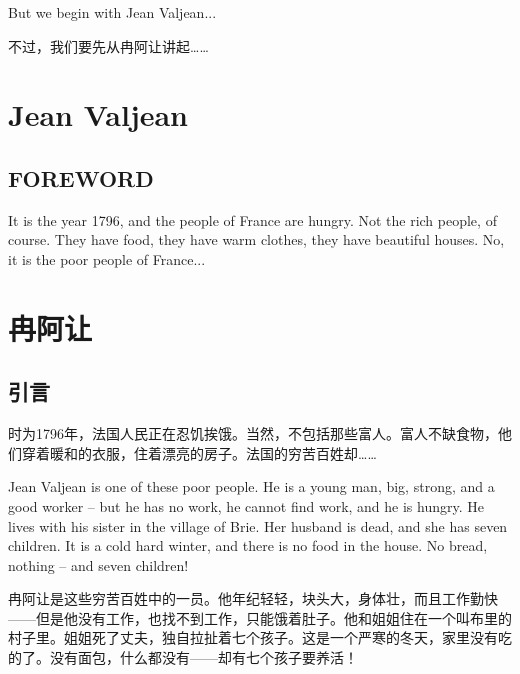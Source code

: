 \documentclass[fontset=ubuntu, zihao=5]{ctexart}
\begin{document}
\begin{paracol}{2}
  \switchcolumn*

  But we begin with Jean Valjean...


  \switchcolumn

  不过，我们要先从冉阿让讲起……

\end{paracol}

\clearpage

\begin{paracol}{2}

  \section{Jean Valjean}

  \subsection{FOREWORD}

  It is the year 1796, and the people of France are hungry. Not the rich people, of course. They have food, they have warm clothes, they have beautiful houses. No, it is the poor people of France...

  \switchcolumn

  \section*{冉阿让}
  \subsection*{引言}

  时为1796年，法国人民正在忍饥挨饿。当然，不包括那些富人。富人不缺食物，他们穿着暖和的衣服，住着漂亮的房子。法国的穷苦百姓却……

  \switchcolumn*

  Jean Valjean is one of these poor people. He is a young man, big, strong, and a good worker – but he has no work, he cannot find work, and he is hungry. He lives with his sister in the village of Brie. Her husband is dead, and she has seven children. It is a cold hard winter, and there is no food in the house. No bread, nothing – and seven children!

  \switchcolumn
  冉阿让是这些穷苦百姓中的一员。他年纪轻轻，块头大，身体壮，而且工作勤快——但是他没有工作，也找不到工作，只能饿着肚子。他和姐姐住在一个叫布里的村子里。姐姐死了丈夫，独自拉扯着七个孩子。这是一个严寒的冬天，家里没有吃的了。没有面包，什么都没有——却有七个孩子要养活！


\end{paracol}
\end{document}
